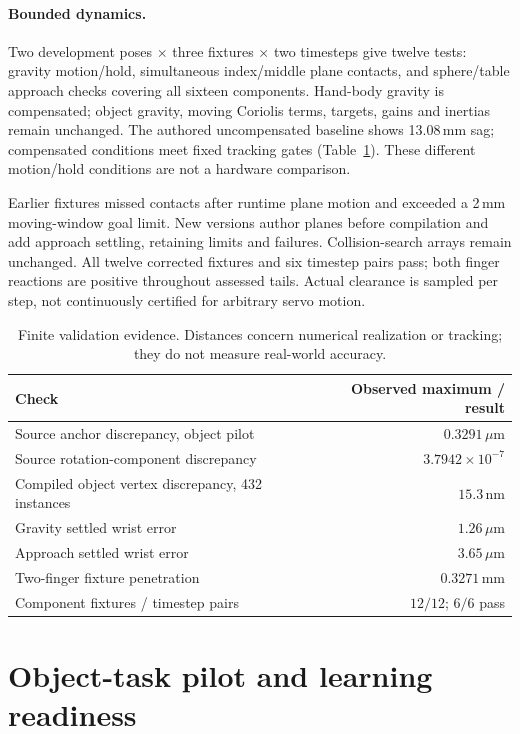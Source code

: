 \paragraph{Bounded dynamics.}
Two development poses $\times$ three fixtures $\times$ two timesteps give twelve tests: gravity motion/hold, simultaneous index/middle plane contacts, and sphere/table approach checks covering all sixteen components. Hand-body gravity is compensated; object gravity, moving Coriolis terms, targets, gains and inertias remain unchanged. The authored uncompensated baseline shows 13.08\,mm sag; compensated conditions meet fixed tracking gates (Table~\ref{tab:validation}). These different motion/hold conditions are not a hardware comparison.

Earlier fixtures missed contacts after runtime plane motion and exceeded a 2\,mm moving-window goal limit. New versions author planes before compilation and add approach settling, retaining limits and failures. Collision-search arrays remain unchanged. All twelve corrected fixtures and six timestep pairs pass; both finger reactions are positive throughout assessed tails. Actual clearance is sampled per step, not continuously certified for arbitrary servo motion.

\begin{table}[t]
\centering
\caption{Finite validation evidence. Distances concern numerical realization or tracking; they do not measure real-world accuracy.}
\label{tab:validation}
\begin{tabular}{lr}\toprule
Check & Observed maximum / result\\\midrule
Source anchor discrepancy, object pilot & $0.3291\,\mu$m\\
Source rotation-component discrepancy & $3.7942\times10^{-7}$\\
Compiled object vertex discrepancy, 432 instances & $15.3$\,nm\\
Gravity settled wrist error & $1.26\,\mu$m\\
Approach settled wrist error & $3.65\,\mu$m\\
Two-finger fixture penetration & $0.3271$\,mm\\
Component fixtures / timestep pairs & $12/12$; $6/6$ pass\\\bottomrule
\end{tabular}
\end{table}

\section{Object-task pilot and learning readiness}
